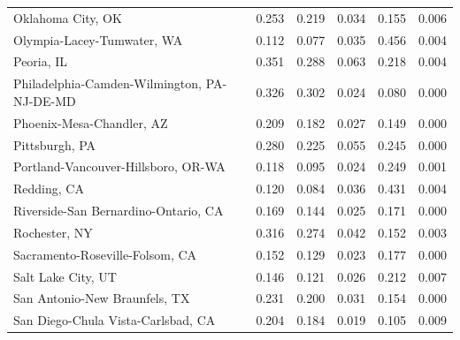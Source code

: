 \begin{longtable}{lrrrrr}
                           Oklahoma City, OK &              0.253 &              0.219 &                 0.034 &           0.155 &       0.006 \\
                  Olympia-Lacey-Tumwater, WA &              0.112 &              0.077 &                 0.035 &           0.456 &       0.004 \\
                                  Peoria, IL &              0.351 &              0.288 &                 0.063 &           0.218 &       0.004 \\
 Philadelphia-Camden-Wilmington, PA-NJ-DE-MD &              0.326 &              0.302 &                 0.024 &           0.080 &       0.000 \\
                   Phoenix-Mesa-Chandler, AZ &              0.209 &              0.182 &                 0.027 &           0.149 &       0.000 \\
                              Pittsburgh, PA &              0.280 &              0.225 &                 0.055 &           0.245 &       0.000 \\
         Portland-Vancouver-Hillsboro, OR-WA &              0.118 &              0.095 &                 0.024 &           0.249 &       0.001 \\
                                 Redding, CA &              0.120 &              0.084 &                 0.036 &           0.431 &       0.004 \\
        Riverside-San Bernardino-Ontario, CA &              0.169 &              0.144 &                 0.025 &           0.171 &       0.000 \\
                               Rochester, NY &              0.316 &              0.274 &                 0.042 &           0.152 &       0.003 \\
             Sacramento-Roseville-Folsom, CA &              0.152 &              0.129 &                 0.023 &           0.177 &       0.000 \\
                          Salt Lake City, UT &              0.146 &              0.121 &                 0.026 &           0.212 &       0.007 \\
               San Antonio-New Braunfels, TX &              0.231 &              0.200 &                 0.031 &           0.154 &       0.000 \\
          San Diego-Chula Vista-Carlsbad, CA &              0.204 &              0.184 &                 0.019 &           0.105 &       0.009 \\

\end{longtable}
